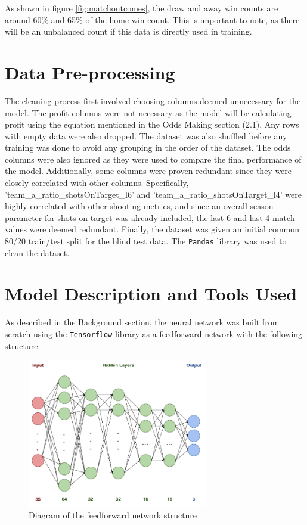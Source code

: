 \documentclass[rgb,listoffigures,listoftables,final]{cam-thesis}
\begin{document}
    As shown in figure \ref{fig:matchoutcomes}, the draw and away win counts are around 60\% and 65\% of the home win count. This is important to note, as there will be an unbalanced count if this data is directly used in training.
    
    \section{Data Pre-processing}
    The cleaning process first involved choosing columns deemed unnecessary for the model. The profit columns were not necessary as the model will be calculating profit using the equation mentioned in the Odds Making section (2.1). Any rows with empty data were also dropped. The dataset was also shuffled before any training was done to avoid any grouping in the order of the dataset. The odds columns were also ignored as they were used to compare the final performance of the model. Additionally, some columns were proven redundant since they were closely correlated with other columns. Specifically, 'team\_a\_ratio\_shotsOnTarget\_l6' and 'team\_a\_ratio\_shotsOnTarget\_l4' were highly correlated with other shooting metrics, and since an overall season parameter for shots on target was already included, the last 6 and last 4 match values were deemed redundant. Finally, the dataset was given an initial common 80/20 train/test split for the blind test data. The \texttt{Pandas} library was used to clean the dataset.

    
    \section{Model Description and Tools Used}
    As described in the Background section, the neural network was built from scratch using the \texttt{Tensorflow} library as a feedforward network with the following structure:

    \begin{figure}[H]
        \centering
        \includegraphics[width=0.7\textwidth]{figures/modelstructure.png}
        \caption{Diagram of the feedforward network structure}
        \label{fig:modelstructure}
    \end{figure}
\end{document}
